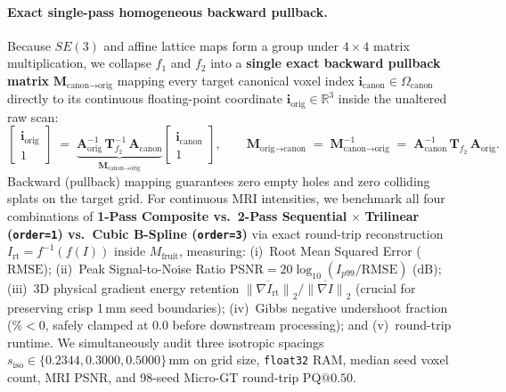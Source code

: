 \documentclass[10pt,a4paper]{article}
\renewcommand{\_}{\origunderscore\allowbreak}
\begin{document}
\paragraph{Exact single-pass homogeneous backward pullback.}
Because $SE(3)$ and affine lattice maps form a group under $4\times 4$ matrix multiplication, we collapse $f_1$ and $f_2$ into a \textbf{single exact backward pullback matrix} $\mathbf{M}_{\text{canon}\to\text{orig}}$ mapping every target canonical voxel index $\mathbf{i}_{\text{canon}} \in \Omega_{\text{canon}}$ directly to its continuous floating-point coordinate $\mathbf{i}_{\text{orig}} \in \mathbb{R}^3$ inside the unaltered raw scan:
\begin{equation}
    \begin{bmatrix} \mathbf{i}_{\text{orig}} \\ 1 \end{bmatrix}
    \;=\;
    \underbrace{\mathbf{A}_{\text{orig}}^{-1}\,\mathbf{T}_{f_2}^{-1}\,\mathbf{A}_{\text{canon}}}_{\mathbf{M}_{\text{canon}\to\text{orig}}}
    \begin{bmatrix} \mathbf{i}_{\text{canon}} \\ 1 \end{bmatrix},
    \qquad
    \mathbf{M}_{\text{orig}\to\text{canon}} \;=\; \mathbf{M}_{\text{canon}\to\text{orig}}^{-1}
    \;=\; \mathbf{A}_{\text{canon}}^{-1}\,\mathbf{T}_{f_2}\,\mathbf{A}_{\text{orig}}.
    \label{eq:pullback_matrix}
\end{equation}
Backward (pullback) mapping guarantees zero empty holes and zero colliding splats on the target grid. For continuous MRI intensities, we benchmark all four combinations of \textbf{1-Pass Composite vs.\ 2-Pass Sequential} $\times$ \textbf{Trilinear (\texttt{order=1}) vs.\ Cubic B-Spline (\texttt{order=3})} via exact round-trip reconstruction $I_{\text{rt}} = f^{-1}(f(I))$ inside $M_{\text{fruit}}$, measuring: (i)~Root Mean Squared Error ($\text{RMSE}$); (ii)~Peak Signal-to-Noise Ratio $\text{PSNR} = 20\log_{10}(I_{p99}/\text{RMSE})$ ($\text{dB}$); (iii)~3D physical gradient energy retention $\overline{\|\nabla I_{\text{rt}}\|}_2 / \overline{\|\nabla I\|}_2$ (crucial for preserving crisp 1\,mm seed boundaries); (iv)~Gibbs negative undershoot fraction ($\% < 0$, safely clamped at $0.0$ before downstream processing); and (v)~round-trip runtime. We simultaneously audit three isotropic spacings $s_{\text{iso}} \in \{0.2344, 0.3000, 0.5000\}\,\text{mm}$ on grid size, \texttt{float32} RAM, median seed voxel count, MRI PSNR, and 98-seed Micro-GT round-trip $\text{PQ@0.50}$.
\end{document}
